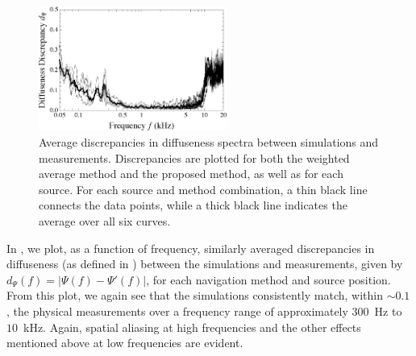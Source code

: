 \begin{figure}[t]
\centering
  \includegraphics[width = 0.55\textwidth]{10_experimental_validation/figures/merimaa2005_fullexp_F.eps}
  \caption[Experimental discrepancies in diffuseness spectra.]{
  Average discrepancies in diffuseness spectra between simulations and measurements.
  Discrepancies are plotted for both the weighted average method and the proposed method,
  as well as for each source.
  For each source and method combination, a thin black line connects the data points, while a thick black line indicates the average over all six curves.}
  \label{fig:10_Experimental_Validation:Diffuseness_Freq_Discrepancy}
\end{figure}

In , we plot, as a function of frequency, similarly averaged discrepancies in diffuseness (as defined in ) between the simulations and measurements, given by $d_\Psi(f) = |\Psi(f) - \Psi'(f)|$, for each navigation method and source position.
From this plot, we again see that the simulations consistently match, within $\sim0.1$, the physical measurements over a frequency range of approximately $300$~Hz to $10$~kHz.
Again, spatial aliasing at high frequencies and the other effects mentioned above at low frequencies are evident.

